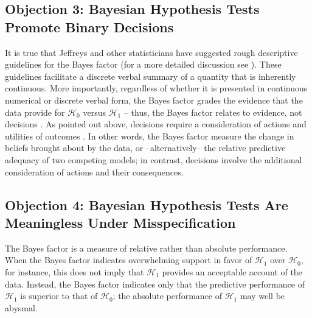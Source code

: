 \subsection{Objection 3: Bayesian Hypothesis Tests Promote Binary Decisions}
It is true that Jeffreys and other statisticians have suggested rough descriptive guidelines for the Bayes factor (for a more detailed discussion see ). These guidelines facilitate a discrete verbal summary of a quantity that is inherently continuous. More importantly, regardless of whether it is presented in continuous numerical or discrete verbal form, the Bayes factor grades the evidence that the data provide for $\mathcal{H}_0$ versus $\mathcal{H}_1$ -- thus, the Bayes factor relates to evidence, not decisions \cite{LyEtAl2016Rejoinder}. As pointed out above, decisions require a consideration of actions and utilities of outcomes \cite{Lindley1985}. In other words, the Bayes factor measure the change in beliefs brought about by the data, or --alternatively-- the relative predictive adequacy of two competing models; in contrast, decisions involve the additional consideration of actions and their consequences.

\subsection{Objection 4: Bayesian Hypothesis Tests Are Meaningless Under Misspecification}
The Bayes factor is a measure of relative rather than absolute performance. When the Bayes factor indicates overwhelming support in favor of $\mathcal{H}_1$ over $\mathcal{H}_0$, for instance, this does not imply that $\mathcal{H}_1$ provides an acceptable account of the data. Instead, the Bayes factor indicates only that the predictive performance of $\mathcal{H}_1$ is superior to that of $\mathcal{H}_0$; the absolute performance of $\mathcal{H}_1$ may well be abysmal.

